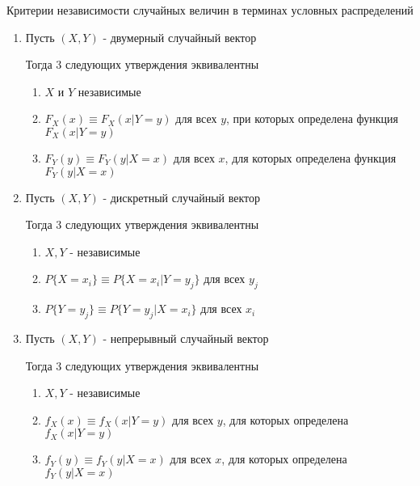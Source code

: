 \documentclass[a4paper, 14pt]{report}
\begin{document}
\begin{theorem}
    Критерии независимости случайных величин в терминах условных распределений

    \begin{enumerate}
        \item Пусть $(X,Y)$ - двумерный случайный вектор

            Тогда 3 следующих утверждения эквивалентны

            \begin{enumerate}
                \item $X$ и $Y$ независимые
                \item $F_X(x) \equiv F_X(x|Y=y)$ для всех $y$, при которых определена функция $F_X(x|Y=y)$
                \item $F_Y(y) \equiv F_Y(y|X=x)$ для всех $x$, для которых определена функция $F_Y(y|X=x)$
            \end{enumerate}

        \item Пусть $(X,Y)$ - дискретный случайный вектор

            Тогда 3 следующих утверждения эквивалентны

            \begin{enumerate}
                \item $X,Y$ - независимые
                \item $P\{X=x_i\} \equiv P\{X=x_i|Y=y_j\}$ для всех $y_j$
                \item $P\{Y=y_j\} \equiv P\{Y=y_j|X=x_i\}$ для всех $x_i$
            \end{enumerate}

        \item Пусть $(X,Y)$ - непрерывный случайный вектор

            Тогда 3 следующих утверждения эквивалентны

            \begin{enumerate}
                \item $X,Y$ - независимые
                \item $f_X(x) \equiv f_X(x|Y=y)$ для всех $y$, для которых определена $f_X(x|Y=y)$
                \item $f_Y(y) \equiv f_Y(y|X=x)$ для всех $x$, для которых определена $f_Y(y|X=x)$
            \end{enumerate}
    \end{enumerate}
\end{theorem}
\end{document}

